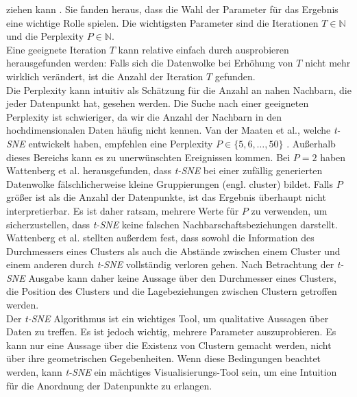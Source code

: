 \documentclass[12pt,letterpaper,ngerman]{article}
\begin{document}
ziehen kann \cite{wattenberg2016how}. 
Sie fanden heraus, dass die Wahl der Parameter 
für das Ergebnis eine wichtige Rolle spielen. Die wichtigsten 
Parameter sind die Iterationen $T\in \mathbb{N}$ und die Perplexity 
$P \in \mathbb{N}$.\\
Eine geeignete Iteration $T$ kann relative einfach durch ausprobieren 
herausgefunden werden: Falls sich die Datenwolke bei Erhöhung
von $T$ nicht mehr wirklich verändert, ist die Anzahl der Iteration
$T$ gefunden. 
\pagebreak
\hfill\\
Die Perplexity kann intuitiv als Schätzung für die Anzahl an nahen 
Nachbarn, die jeder Datenpunkt hat, gesehen werden.
Die Suche nach einer geeigneten Perplexity ist schwieriger, 
da wir die Anzahl der Nachbarn in den hochdimensionalen 
Daten häufig nicht kennen. Van der Maaten et al., welche  
\textit{t-SNE} entwickelt haben,
empfehlen eine Perplexity $P \in \{5,6, \dots, 50\}$ 
\cite{JMLR:v9:vandermaaten08a}.
Außerhalb dieses Bereichs kann es zu unerwünschten Ereignissen 
kommen. Bei $P=2$ haben Wattenberg et al. herausgefunden, 
dass  \textit{t-SNE} bei einer zufällig generierten Datenwolke 
fälschlicherweise kleine Gruppierungen (engl. cluster) bildet. 
Falls $P$ größer ist als die Anzahl der Datenpunkte, ist das
Ergebnis überhaupt nicht interpretierbar. Es ist daher ratsam,
mehrere Werte für $P$ zu verwenden, um sicherzustellen, 
dass  \textit{t-SNE} keine falschen Nachbarschaftsbeziehungen darstellt.\\
Wattenberg et al. stellten außerdem fest, dass sowohl die 
Information des Durchmessers eines Clusters als auch die Abstände 
zwischen einem Cluster und einem anderen durch  \textit{t-SNE}
vollständig  verloren gehen. Nach Betrachtung der  
\textit{t-SNE} Ausgabe kann daher 
keine Aussage über den Durchmesser eines Clusters, die Position 
des Clusters und die Lagebeziehungen zwischen Clustern getroffen 
werden.\\
Der  \textit{t-SNE} Algorithmus ist ein wichtiges Tool, um qualitative
Aussagen über Daten zu treffen. Es ist jedoch wichtig, mehrere 
Parameter auszuprobieren. Es kann nur eine Aussage über die 
Existenz von Clustern gemacht werden, nicht über ihre geometrischen 
Gegebenheiten. Wenn diese Bedingungen beachtet werden, kann  \textit{t-SNE}
ein mächtiges Visualisierungs-Tool sein, um eine Intuition für die
Anordnung der Datenpunkte zu erlangen.

\end{document}
